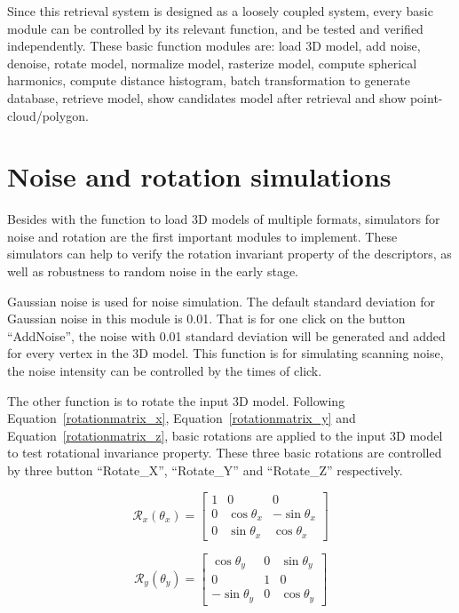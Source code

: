 Since this retrieval system is designed as a loosely coupled system, every basic module can be controlled by its relevant function, and be tested and verified independently. These basic function modules are: load 3D model, add noise, denoise, rotate model, normalize model, rasterize model, compute spherical harmonics, compute distance histogram, batch transformation to generate database, retrieve model, show candidates model after retrieval and show point-cloud/polygon. 

\section{Noise and rotation simulations}

Besides with the function to load 3D models of multiple formats, simulators for noise and rotation are the first important modules to implement. These simulators can help to verify the rotation invariant property of the descriptors, as well as robustness to random noise in the early stage.

Gaussian noise is used for noise simulation. The default standard deviation for Gaussian noise in this module is 0.01. That is for one click on the button ``AddNoise'', the noise with 0.01 standard deviation will be generated and added for every vertex in the 3D model. This function is for simulating scanning noise, the noise intensity can be controlled by the times of click. 

The other function is to rotate the input 3D model. Following Equation~\ref{rotationmatrix_x}, Equation~\ref{rotationmatrix_y} and Equation~\ref{rotationmatrix_z}, basic rotations are applied to the input 3D model to test rotational invariance property. These three basic rotations are controlled by three button ``Rotate\_X'', ``Rotate\_Y'' and ``Rotate\_Z'' respectively. 

\begin{equation} \label{rotationmatrix_x}
  \mathcal{R}_x(\theta_x)=
  \begin{bmatrix}
    1 & 0 & 0 \\
    0 &  \cos{\theta_x} &  -\sin{\theta_x} \\
    0 &  \sin{\theta_x} & \cos{\theta_x}
  \end{bmatrix}
\end{equation}

\begin{equation} \label{rotationmatrix_y}
  \mathcal{R}_y(\theta_y)=
  \begin{bmatrix}
    \cos{\theta_y} & 0 & \sin{\theta_y} \\
    0 & 1 & 0 \\
     -\sin{\theta_y} & 0 & \cos{\theta_y}
  \end{bmatrix} 
\end{equation}

